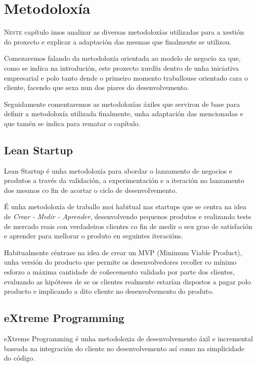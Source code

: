 \chapter{Metodoloxía}
\minitoc


  \lettrine{N}{este} capítulo imos analizar as diversas metodoloxías utilizadas para a 
xestión do proxecto e explicar a adaptación das mesmas que finalmente se 
utilizou.

  Comezaremos falando da metodoloxía orientada ao modelo de negocio xa que, 
como se indica na introdución, este proxecto xurdíu dentro de unha iniciativa 
empresarial e polo tanto dende o primeiro momento traballouse orientado cara o 
cliente, facendo que sexa nun dos piares do desenvolvemento.

  Seguidamente comentaremos as metodoloxías áxiles que serviron de base para 
definir a metodoloxía utilizada finalmente, unha adaptación das mencionadas e 
que tamén se indica para rematar o capítulo.

  \section{Lean Startup}
  Lean Startup\cite{book:leanstartup} é unha metodoloxía para abordar o 
lanzamento de negocios e produtos a través da validación, a experimentación e a 
iteración no lanzamento dos mesmos co fin de acortar o ciclo de desenvolvemento.

  É unha metodoloxía de traballo moi habitual nas startups que se centra na 
idea de \emph{Crear - Medir - Aprender}, desenvolvendo pequenos produtos e 
realizando tests de mercado reais con verdadeiros clientes co fin de medir o 
seu grao de satisfación e aprender para mellorar o produto en seguintes 
iteracións.

  Habitualmente céntrase na idea de crear un MVP (Minimum Viable Product), 
unha versión do producto que permite os desenvolvedores recoller co mínimo 
esforzo a máxima cantidade de coñecemento validado por parte dos clientes, 
evaluando as hipóteses de se os clientes realmente estarían dispostos a pagar 
polo producto e implicando a dito cliente no desenvolvemento do produto.

  \section{eXtreme Programming}
  \label{sec:method:extreme}
  eXtreme Programming\cite{book:agile} é unha metodoloxia de desenvolvemento 
áxil e incremental baseada na integración do cliente no desenvolvemento así como 
na simplicidade do código.

